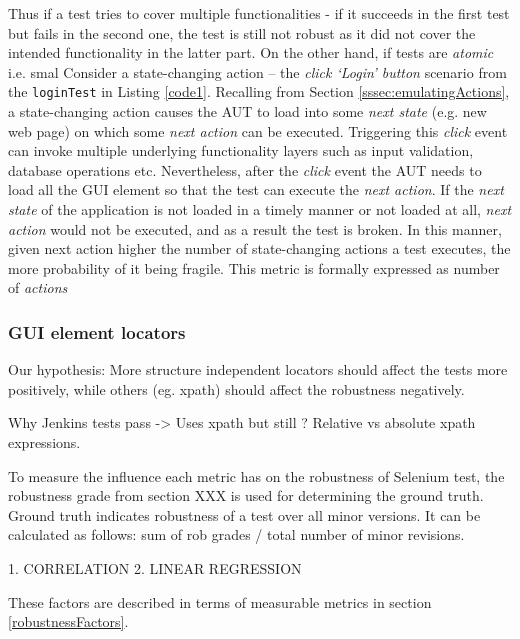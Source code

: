 Thus if a test tries to cover multiple functionalities - if it succeeds in the first test but fails in the second one, the test is still not robust as it did not cover the intended functionality in the latter part. On the other hand, if tests are \textit{atomic} i.e. smal 
Consider a state-changing action -- the \textit{click `Login' button} scenario from the \texttt{loginTest} in Listing \ref{code1}. Recalling from Section \ref{sssec:emulatingActions}, a state-changing action causes the AUT to load into some \textit{next state} (e.g. new web page) on which some \textit{next action} can be executed. Triggering this \textit{click} event can invoke multiple underlying functionality layers such as input validation, database operations etc.
Nevertheless, after the \textit{click} event the AUT needs to load all the GUI element so that the test can execute the \textit{next action}. If the \textit{next state} of the application is not loaded in a timely manner or not loaded at all, \textit{next action} would not be executed, and as a result the test is broken. In this manner, given next action higher the number of state-changing actions a test executes, the more probability of it being fragile. This metric is formally expressed as number of \textit{actions}

\subsubsection*{GUI element locators}

Our hypothesis: More structure independent locators should affect the tests more positively, while others (eg. xpath) should affect the robustness negatively. 

Why Jenkins tests pass -> Uses xpath but still ? Relative vs absolute xpath expressions. 

To measure the influence each metric has on the robustness of Selenium test, the robustness grade from section XXX is used for determining the ground truth. Ground truth indicates robustness of a test over all minor versions. It can be calculated as follows:
sum of rob grades / total number of minor revisions. 

1. CORRELATION
2. LINEAR REGRESSION

These factors are described in terms of measurable metrics in section \ref{robustnessFactors}.


